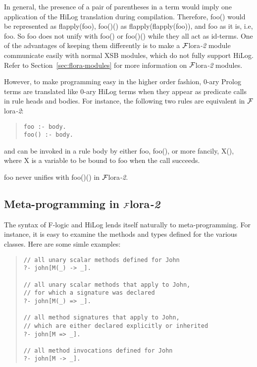 \documentclass[11pt]{article}
\newcommand{\FLORA}{{\mbox{${\cal F}${\sc lora}\rm\emph{-2}}}\xspace}
\newcommand{\fl}{\mbox{F-logic}\xspace}
\begin{document}
In general, the presence of a pair of parentheses in a term would imply
one application of the HiLog translation during
compilation. Therefore, {\sf foo()} would be represented as
{\sf flapply(foo)}, {\sf foo()()} as {\sf flapply(flapply(foo))},
and {\sf foo} as it is, i.e, {\sf foo}.  So {\sf foo} does not unify
with {\sf foo()} or {\sf foo()()} while they all act as id-terms. One
of the advantages of keeping them differently is to make a \FLORA module
communicate easily with normal XSB modules, which do not fully support
HiLog. Refer to Section~\ref{sec:flora-modules} for more information
on \FLORA modules.

However, to make programming easy in the higher order fashion, 0-ary
Prolog terms are translated like 0-ary HiLog terms when they appear
as predicate calls in rule heads and bodies. For instance, the
following two rules are equivalent in \FLORA:
\begin{quote}
\begin{verbatim}
foo :- body.
foo() :- body.
\end{verbatim}
\end{quote}
and can be invoked in a rule body by either {\sf foo}, {\sf foo()},
or more fancily, {\sf X()}, where {\sf X} is a variable to be bound
to {\sf foo} when the call succeeds.

{\sf foo} never unifies with {\sf foo()()} in \FLORA.


\subsection{Meta-programming in \FLORA}


%
The syntax of \fl and HiLog lends itself naturally to meta-programming. For
instance, it is easy to examine the methods and types defined for the
various classes.  Here are some simle examples:
\begin{quote}
\begin{verbatim}
// all unary scalar methods defined for John
?- john[M(_) -> _].

// all unary scalar methods that apply to John,
// for which a signature was declared
?- john[M(_) => _].

// all method signatures that apply to John,
// which are either declared explicitly or inherited
?- john[M => _].

// all method invocations defined for John
?- john[M -> _].
\end{verbatim}
\end{quote}
\end{document}
